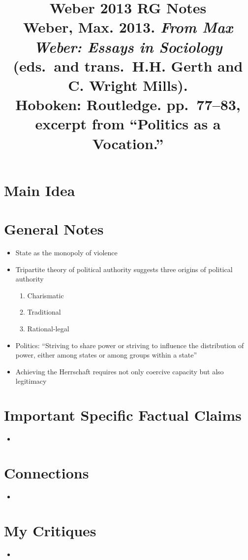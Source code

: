 \documentclass[12pt]{article}
\title{\textbf{Weber 2013 RG Notes}\\
\large Weber, Max. 2013. \textit{From Max Weber: Essays in Sociology} (eds.\ and trans.\ H.H. Gerth and C. Wright Mills).\\
Hoboken: Routledge. pp.\ 77--83, excerpt from ``Politics as a Vocation.''}
\author{}
\date{}
\begin{document}
\maketitle

\section{Main Idea}



\section{General Notes}

\begin{itemize}[leftmargin=*, itemsep=4pt]
    \item State as the monopoly of violence
    \item Tripartite theory of political authority suggests three origins of political authority
    \begin{enumerate}
        \item Charismatic
        \item Traditional
        \item Rational-legal
    \end{enumerate}
    \item Politics: ``Striving to share power or striving to influence the distribution of power, either among states or among groups within a state''
    \item Achieving the Herrschaft requires not only coercive capacity but also legitimacy
\end{itemize}


\section{Important Specific Factual Claims}

\begin{itemize}[leftmargin=*, itemsep=4pt]
    \item
\end{itemize}


\section{Connections}

\begin{itemize}[leftmargin=*, itemsep=4pt]
    \item
\end{itemize}


\section{My Critiques}

\begin{itemize}[leftmargin=*, itemsep=4pt]
    \item
\end{itemize}
\end{document}

